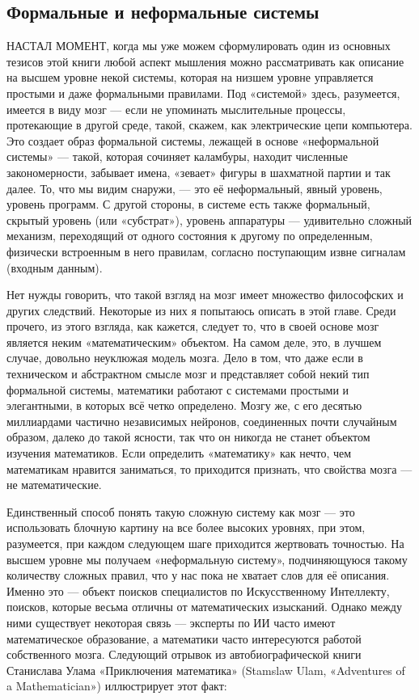 \documentclass[../main.tex]{subfiles}
\begin{document}

\subsection{Формальные и неформальные системы}

НАСТАЛ МОМЕНТ, когда мы уже можем сформулировать один из основных тезисов этой книги любой аспект мышления можно рассматривать как описание на высшем уровне некой системы, которая на низшем уровне управляется простыми и даже формальными правилами. Под «системой» здесь, разумеется, имеется в виду мозг --- если не упоминать мыслительные процессы, протекающие в другой среде, такой, скажем, как электрические цепи компьютера. Это создает образ формальной системы, лежащей в основе «неформальной системы» --- такой, которая сочиняет каламбуры, находит численные закономерности, забывает имена, «зевает» фигуры в шахматной партии и так далее. То, что мы видим снаружи, --- это её неформальный, явный уровень, уровень программ. С другой стороны, в системе есть также формальный, скрытый уровень (или «субстрат»), уровень аппаратуры --- удивительно сложный механизм, переходящий от одного состояния к другому по определенным, физически встроенным в него правилам, согласно поступающим извне сигналам (входным данным).

Нет нужды говорить, что такой взгляд на мозг имеет множество философских и других следствий. Некоторые из них я попытаюсь описать в этой главе. Среди прочего, из этого взгляда, как кажется, следует то, что в своей основе мозг является неким «математическим» объектом. На самом деле, это, в лучшем случае, довольно неуклюжая модель мозга. Дело в том, что даже если в техническом и абстрактном смысле мозг и представляет собой некий тип формальной системы, математики работают с системами простыми и элегантными, в которых всё четко определено. Мозгу же, с его десятью миллиардами частично независимых нейронов, соединенных почти случайным образом, далеко до такой ясности, так что он никогда не станет объектом изучения математиков. Если определить «математику» как нечто, чем математикам нравится заниматься, то приходится признать, что свойства мозга --- не математические.

Единственный способ понять такую сложную систему как мозг --- это использовать блочную картину на все более высоких уровнях, при этом, разумеется, при каждом следующем шаге приходится жертвовать точностью. На высшем уровне мы получаем «неформальную систему», подчиняющуюся такому количеству сложных правил, что у нас пока не хватает слов для её описания. Именно это --- объект поисков специалистов по Искусственному Интеллекту, поисков, которые весьма отличны от математических изысканий. Однако между ними существует некоторая связь --- эксперты по ИИ часто имеют математическое образование, а математики часто интересуются работой собственного мозга. Следующий отрывок из автобиографической книги Станислава Улама «Приключения математика» (Stamslaw Ulam, «Adventures of a Mathematician») иллюстрирует этот факт:
\end{document}
